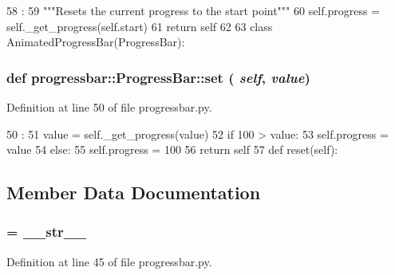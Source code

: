 \begin{DoxyCode}
58                    :
59         """Resets the current progress to the start point"""
60         self.progress = self._get_progress(self.start)
61         return self
62 
63 
class AnimatedProgressBar(ProgressBar):
\end{DoxyCode}
\hypertarget{classprogressbar_1_1ProgressBar_ad47beed6bd8b7239d0e8ce37966c96e6}{
\subsubsection[{set}]{\setlength{\rightskip}{0pt plus 5cm}def progressbar::ProgressBar::set ( {\em self}, \/   {\em value})}}
\label{classprogressbar_1_1ProgressBar_ad47beed6bd8b7239d0e8ce37966c96e6}


Definition at line 50 of file progressbar.py.


\begin{DoxyCode}
50                         :
51         value = self._get_progress(value)
52         if 100 > value:
53             self.progress = value 
54         else:
55             self.progress = 100
56         return self
57 
    def reset(self):
\end{DoxyCode}


\subsection{Member Data Documentation}
\hypertarget{classprogressbar_1_1ProgressBar_aef4ad61d3b7ec3f1b8514ee563268d4c}{
\subsubsection[{\_\-\_\-repr\_\-\_\-}]{ = \_\-\_\-str\_\-\_\-}}
\label{classprogressbar_1_1ProgressBar_aef4ad61d3b7ec3f1b8514ee563268d4c}


Definition at line 45 of file progressbar.py.\hypertarget{classprogressbar_1_1ProgressBar_adb0492e85eacafa26a86c115791e5708}{
\subsubsection[{blank}]{}}
\label{classprogressbar_1_1ProgressBar_adb0492e85eacafa26a86c115791e5708}


